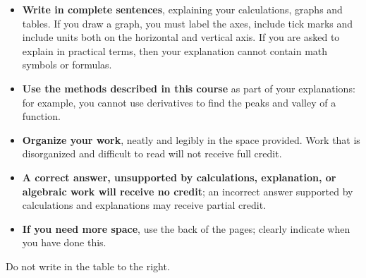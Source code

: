 \documentclass[11pt,answers]{exam}
\begin{document}
\begin{minipage}[t]{3.7in}
\vspace{0pt}
\begin{itemize}

\item \textbf{Write in complete sentences}, explaining your calculations, graphs and tables. If you draw a graph, you must label the axes, include tick marks and include units both on the horizontal and vertical axis. If you are asked to explain in practical terms, then your explanation cannot contain math symbols or formulas.
\item \textbf{Use the methods described in this course} as part of your explanations: for example, you cannot use derivatives to find the peaks and valley of a function.

\item \textbf{Organize your work}, neatly and legibly in
the space provided. Work that is disorganized and difficult to read will not receive full credit.  

\item \textbf{A correct answer, unsupported by calculations, explanation,
or algebraic work will receive no credit}; an incorrect answer supported
by  calculations and explanations may receive
partial credit.


\item \textbf{If you need more space}, use the back of the pages; clearly indicate when you have done this.
\end{itemize}

Do not write in the table to the right.
\end{minipage}
\hfill
\begin{minipage}[t]{2.3in}
\vspace{0pt}
\addpoints %
\combinedgradetable[v][pages]  %

\end{minipage}
\newpage




\end{document}
